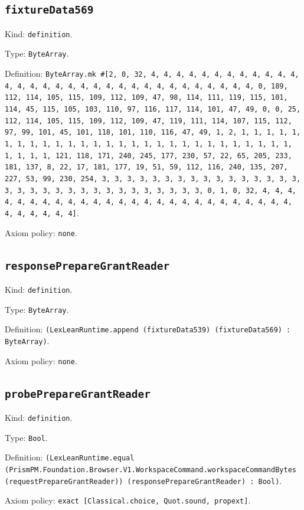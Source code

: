 \documentclass[11pt]{article}
\begin{document}
\subsection*{\texttt{fixtureData569}}
\noindent Kind: \texttt{definition}.\par
\noindent Type: \texttt{ByteArray}.\par
\noindent Definition: \texttt{ByteArray.mk \#[2, 0, 32, 4, 4, 4, 4, 4, 4, 4, 4, 4, 4, 4, 4, 4, 4, 4, 4, 4, 4, 4, 4, 4, 4, 4, 4, 4, 4, 4, 4, 4, 4, 4, 4, 0, 189, 112, 114, 105, 115, 109, 112, 109, 47, 98, 114, 111, 119, 115, 101, 114, 45, 115, 105, 103, 110, 97, 116, 117, 114, 101, 47, 49, 0, 0, 25, 112, 114, 105, 115, 109, 112, 109, 47, 119, 111, 114, 107, 115, 112, 97, 99, 101, 45, 101, 118, 101, 110, 116, 47, 49, 1, 2, 1, 1, 1, 1, 1, 1, 1, 1, 1, 1, 1, 1, 1, 1, 1, 1, 1, 1, 1, 1, 1, 1, 1, 1, 1, 1, 1, 1, 1, 1, 1, 1, 121, 118, 171, 240, 245, 177, 230, 57, 22, 65, 205, 233, 181, 137, 8, 22, 17, 181, 177, 19, 51, 59, 112, 116, 240, 135, 207, 227, 53, 99, 230, 254, 3, 3, 3, 3, 3, 3, 3, 3, 3, 3, 3, 3, 3, 3, 3, 3, 3, 3, 3, 3, 3, 3, 3, 3, 3, 3, 3, 3, 3, 3, 3, 3, 0, 1, 0, 32, 4, 4, 4, 4, 4, 4, 4, 4, 4, 4, 4, 4, 4, 4, 4, 4, 4, 4, 4, 4, 4, 4, 4, 4, 4, 4, 4, 4, 4, 4, 4, 4]}.\par
\noindent Axiom policy: \texttt{none}.\par
\subsection*{\texttt{responsePrepareGrantReader}}
\noindent Kind: \texttt{definition}.\par
\noindent Type: \texttt{ByteArray}.\par
\noindent Definition: \texttt{(LexLeanRuntime.append (fixtureData539) (fixtureData569) : ByteArray)}.\par
\noindent Axiom policy: \texttt{none}.\par
\subsection*{\texttt{probePrepareGrantReader}}
\noindent Kind: \texttt{definition}.\par
\noindent Type: \texttt{Bool}.\par
\noindent Definition: \texttt{(LexLeanRuntime.equal (PrismPM.Foundation.Browser.V1.WorkspaceCommand.workspaceCommandBytes (requestPrepareGrantReader)) (responsePrepareGrantReader) : Bool)}.\par
\noindent Axiom policy: \texttt{exact [Classical.choice, Quot.sound, propext]}.\par
\end{document}
